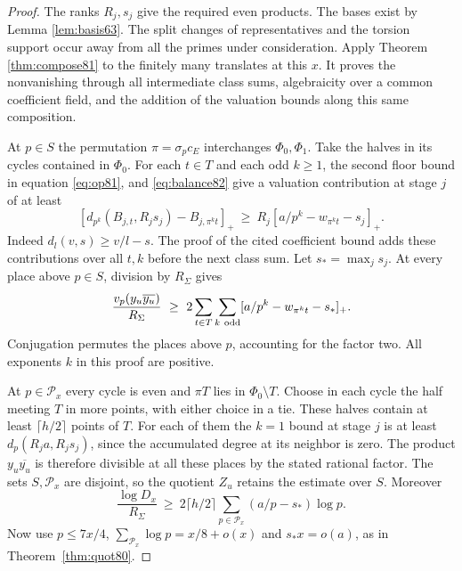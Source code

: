 \documentclass[a4paper,11pt]{article}
\theoremstyle{definition}
\theoremstyle{remark}
\numberwithin{equation}{section}
\begin{document}
\begin{proof}
The ranks \(R_j,s_j\) give the required even products. The bases
exist by Lemma \ref{lem:basis63}. The split changes of representatives
and the torsion support occur away from all the primes under
consideration. Apply
Theorem \ref{thm:compose81}
to the finitely many translates at this \(x\). It proves the
nonvanishing through all intermediate class sums, algebraicity
over a common coefficient field, and the addition of the
valuation bounds along this same composition.

At \(p\in S\) the permutation \(\pi=\sigma_pc_E\) interchanges
\(\Phi_0,\Phi_1\). Take the halves in its cycles contained in
\(\Phi_0\). For each \(t\in T\) and each odd \(k\ge1\), the
second floor bound in equation \ref{eq:op81}, and
\eqref{eq:balance82} give a valuation contribution at stage \(j\)
of at least
\[
 [d_{p^k}(B_{j,t},R_j s_j)-B_{j,\pi^kt}]_+
       \ \ge\ R_j[a/p^k-w_{\pi^k t}-s_j]_+ .
\]
Indeed \(d_l(v,s)\ge v/l-s\). The proof of the cited coefficient
bound adds these contributions over all \(t,k\) before the
next class sum. Let \(s_*=\max_j s_j\). At every place above
\(p\in S\), division by \(R_\Sigma\) gives
\[
 \frac{v_p(y_u\overline {y_u})}{R_\Sigma}
       \ \ge\ 2\sum_{t\in T}\sum_{k\ {\rm odd}}
                         [a/p^k-w_{\pi^k t}-s_*]_+ .
\]
Conjugation permutes the places above \(p\), accounting for the
factor two. All exponents \(k\) in this proof are positive.

At \(p\in\mathcal P_x\) every cycle is even and \(\pi T\) lies
in \(\Phi_0\setminus T\). Choose in each cycle the half meeting
\(T\) in more points, with either choice in a tie. These halves
contain at least \(\lceil h/2\rceil\) points of \(T\). For each
of them the \(k=1\) bound at stage \(j\) is at least
\(d_p(R_j a,R_j s_j)\), since the accumulated degree at its
neighbor is zero. The product \(y_u\overline{y_u}\) is therefore
divisible at all these places by the stated rational factor.
The sets \(S,\mathcal P_x\) are disjoint, so the quotient \(Z_u\)
retains the estimate over \(S\). Moreover
\[
 \frac{\log D_x}{R_\Sigma}\ \ge\
    2\lceil h/2\rceil\sum_{p\in\mathcal P_x}(a/p-s_*)\log p .
\]
Now use \(p\le7x/4\), \(\sum_{\mathcal P_x}\log p=x/8+o(x)\)
and \(s_*x=o(a)\), as in Theorem~\ref{thm:quot80}.


\end{proof}
\end{document}
